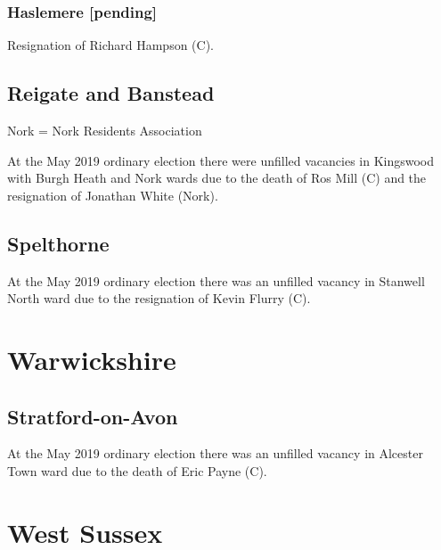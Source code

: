 \documentclass[a4paper,openany]{book}
\begin{document}
\begin{resultsiii}
\subsubsection*{Haslemere \hspace*{\fill}\nolinebreak[1]%
	\enspace\hspace*{\fill}
	[pending]}


Resignation of Richard Hampson (C).

\subsection*{Reigate and Banstead}

Nork = Nork Residents Association

At the May 2019 ordinary election there were unfilled vacancies in Kingswood with Burgh Heath and Nork wards due to the death of Ros Mill (C) and the resignation of Jonathan White (Nork).

\subsection*{Spelthorne}

At the May 2019 ordinary election there was an unfilled vacancy in Stanwell North ward due to the resignation of Kevin Flurry (C).

\section{Warwickshire}

\subsection*{Stratford-on-Avon}

At the May 2019 ordinary election there was an unfilled vacancy in Alcester Town ward due to the death of Eric Payne (C).

\section{West Sussex}


\end{resultsiii}
\end{document}
